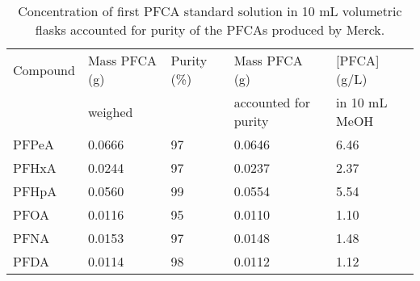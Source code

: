 \begin{table}[ht]
\centering
\caption{Concentration of first PFCA standard solution in 10 mL volumetric flasks accounted for purity of the PFCAs produced by Merck.}
\label{appTab:purityMass}
\begin{tabular}{lllll}
\toprule
Compound & Mass PFCA (g) & Purity (\%) & Mass PFCA (g) & {[}PFCA{]} (g/L) \\ 
& weighed & & accounted for purity & in   10 mL MeOH \\ \midrule
PFPeA & 0.0666 & 97 & 0.0646 & 6.46 \\
PFHxA & 0.0244 & 97 & 0.0237 & 2.37 \\
PFHpA & 0.0560 & 99 & 0.0554 & 5.54 \\
PFOA & 0.0116 & 95 & 0.0110 & 1.10 \\
PFNA & 0.0153 & 97 & 0.0148 & 1.48 \\
PFDA & 0.0114 & 98 & 0.0112 & 1.12 \\ \bottomrule
\end{tabular}
\end{table}


